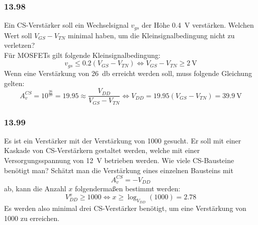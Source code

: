 \documentclass[11pt,a4paper,titlepage]{article}
\begin{document}
\subsubsection*{13.98}
Ein CS-Verstärker soll ein Wechselsignal $v_{gs}$ der Höhe \SI{0.4}{\volt} verstärken. Welchen Wert soll $V_{GS}-V_{TN}$ minimal haben, um die Kleinsignalbedingung nicht zu verletzen?\\
Für MOSFETs gilt folgende Kleinsignalbedingung:
\[ v_{gs} \leq 0.2(V_{GS}-V_{TN}) \Leftrightarrow V_{GS}-V_{TN} \geq \SI{2}{\volt} \]
Wenn eine Verstärkung von \SI{26}{\decibel} erreicht werden soll, muss folgende Gleichung gelten:
\[ A_{v}^{CS} = 10^{\frac{26}{20}} = 19.95 \approx \frac{V_{DD}}{V_{GS}-V_{TN}} \Leftrightarrow V_{DD} = 19.95(V_{GS}-V_{TN}) = \SI{39.9}{\volt} \]

\subsubsection*{13.99}
Es ist ein Verstärker mit der Verstärkung von 1000 gesucht. Er soll mit einer Kaskade von CS-Verstärkern gestaltet werden, welche mit einer Versorgungsspannung von \SI{12}{\volt} betrieben werden. Wie viele CS-Bausteine benötigt man?
Schätzt man die Verstärkung eines einzelnen Bausteins mit 
\[ A_v^{CS} = -V_{DD} \]
ab, kann die Anzahl $x$ folgendermaßen bestimmt werden:
\[ V_{DD}^x \geq 1000 \Leftrightarrow x \geq \log_{V_{DD}}(1000) = 2.78 \]
Es werden also minimal drei CS-Verstärker benötigt, um eine Verstärkung von 1000 zu erreichen.
\end{document}
